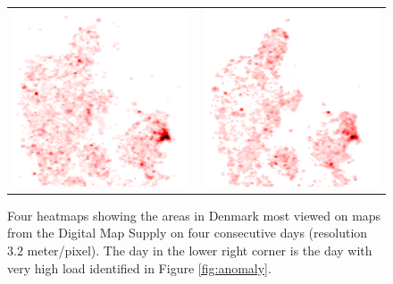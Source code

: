 \documentclass[11pt, oneside]{report}
\begin{document}
{\begin{figure}
\begin{tabular}{cc}
\includegraphics[scale=0.5]{figs-tileheat/heatmap-e_3.png} & \includegraphics[scale=0.5]{figs-tileheat/heatmap-e_4.png} \\
\end{tabular}
\caption{Four heatmaps showing the areas in Denmark most viewed on maps from the Digital Map Supply on four consecutive days (resolution $\mathbf{3.2}$ meter/pixel). The day in the lower right corner is the day with very high load identified in Figure \ref{fig:anomaly}.}
\label{fig:heatmaps}
\end{figure}

}
\end{document}
